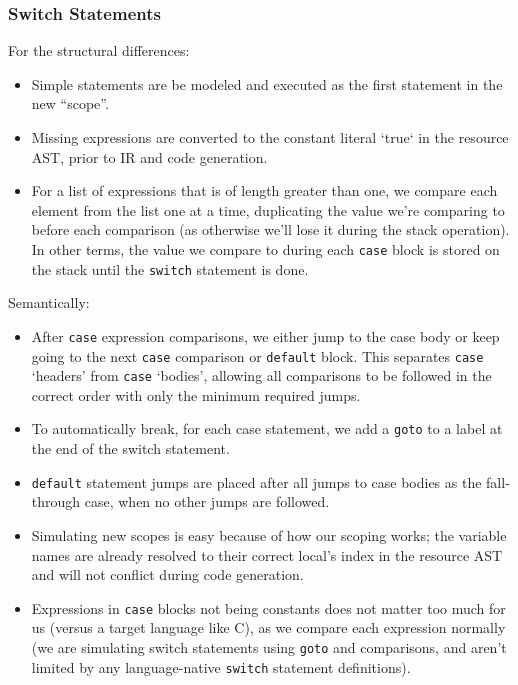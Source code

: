 \documentclass[11pt]{article}
\begin{document}
\subsubsection{Switch Statements}
\label{sec:switch-stmts-codegen}
For the structural differences:
\begin{itemize}[noitemsep]
\item Simple statements are be modeled and executed as the first
  statement in the new ``scope''.
\item Missing expressions are converted to the constant literal
  `true` in the resource AST, prior to IR and code generation.
\item For a list of expressions that is of length greater than one, we
  compare each element from the list one at a time, duplicating
  the value we're comparing to before each comparison (as otherwise
  we'll lose it during the stack operation). In other terms, the value
  we compare to during each \texttt{case} block is stored on the stack
  until the \texttt{switch} statement is done.
\end{itemize}

\noindent Semantically:

\begin{itemize}[noitemsep]
\item After \texttt{case} expression comparisons, we either jump
  to the case body or keep going to the next \texttt{case} comparison
  or \texttt{default} block. This separates \texttt{case} `headers'
  from \texttt{case} `bodies', allowing all comparisons to be followed
  in the correct order with only the minimum required jumps. 
\item To automatically break, for each case statement, we add a
  \texttt{goto} to a label at the end of the switch statement.
\item \texttt{default} statement jumps are placed after all
  jumps to case bodies as the fall-through case, when no other jumps
  are followed.
\item Simulating new scopes is easy because of how our scoping works;
  the variable names are already resolved to their correct local's
  index in the resource AST and will not conflict during code generation.
\item Expressions in \texttt{case} blocks not being constants does not
  matter too much for us (versus a target language like C), as we compare
  each expression normally (we are simulating switch statements using
  \texttt{goto} and comparisons, and aren't limited by any language-native
  \texttt{switch} statement definitions).
\end{itemize}
\end{document}
